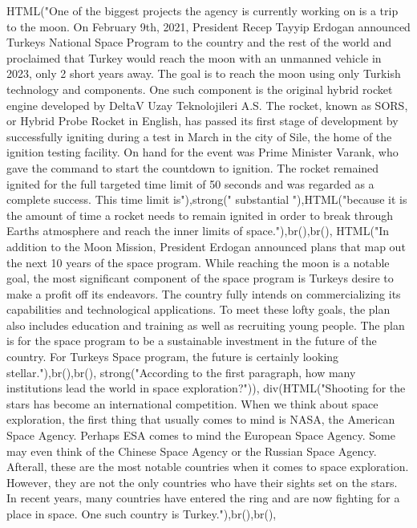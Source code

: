 \documentclass[
]{article}
\newenvironment{Shaded}{\begin{snugshade}}{\end{snugshade}}
\newcommand{\FunctionTok}[1]{\textcolor[rgb]{0.00,0.00,0.00}{#1}}
\newcommand{\NormalTok}[1]{#1}
\newcommand{\StringTok}[1]{\textcolor[rgb]{0.31,0.60,0.02}{#1}}
\begin{document}
\begin{Shaded}
\begin{Highlighting}[]
               \FunctionTok{HTML}\NormalTok{(}\StringTok{"One of the biggest projects the agency is currently working on is a trip to the moon. On February 9th, 2021, President Recep Tayyip Erdogan announced Turkeys National Space Program to the country and the rest of the world and proclaimed that Turkey would reach the moon with an unmanned vehicle in 2023, only 2 short years away. The goal is to reach the moon using only Turkish technology and components. One such component is the original hybrid rocket engine developed by DeltaV Uzay Teknolojileri A.S. The rocket, known as SORS, or Hybrid Probe Rocket in English, has passed its first stage of development by successfully igniting during a test in March in the city of Sile, the home of the ignition testing facility. On hand for the event was Prime Minister Varank, who gave the command to start the countdown to ignition. The rocket remained ignited for the full targeted time limit of 50 seconds and was regarded as a complete success. This time limit is"}\NormalTok{),}\FunctionTok{strong}\NormalTok{(}\StringTok{" substantial "}\NormalTok{),}\FunctionTok{HTML}\NormalTok{(}\StringTok{"because it is the amount of time a rocket needs to remain ignited in order to break through Earths atmosphere and reach the inner limits of space."}\NormalTok{),}\FunctionTok{br}\NormalTok{(),}\FunctionTok{br}\NormalTok{(),}
               \FunctionTok{HTML}\NormalTok{(}\StringTok{"In addition to the Moon Mission, President Erdogan announced plans that map out the next 10 years of the space program. While reaching the moon is a notable goal, the most significant component of the space program is Turkeys desire to make a profit off its endeavors. The country fully intends on commercializing its capabilities and technological applications. To meet these lofty goals, the plan also includes education and training as well as recruiting young people. The plan is for the space program to be a sustainable investment in the future of the country. For Turkeys Space program, the future is certainly looking stellar."}\NormalTok{),}\FunctionTok{br}\NormalTok{(),}\FunctionTok{br}\NormalTok{(),}
               \FunctionTok{strong}\NormalTok{(}\StringTok{"According to the first paragraph, how many institutions lead the world in space exploration?"}\NormalTok{)),}
           \FunctionTok{div}\NormalTok{(}\FunctionTok{HTML}\NormalTok{(}\StringTok{"Shooting for the stars has become an international competition. When we think about space exploration, the first thing that usually comes to mind is NASA, the American Space Agency. Perhaps ESA comes to mind  the European Space Agency. Some may even think of the Chinese Space Agency or the Russian Space Agency. Afterall, these are the most notable countries when it comes to space exploration. However, they are not the only countries who have their sights set on the stars. In recent years, many countries have entered the ring and are now fighting for a place in space. One such country is Turkey."}\NormalTok{),}\FunctionTok{br}\NormalTok{(),}\FunctionTok{br}\NormalTok{(), }

\end{Highlighting}
\end{Shaded}
\end{document}
